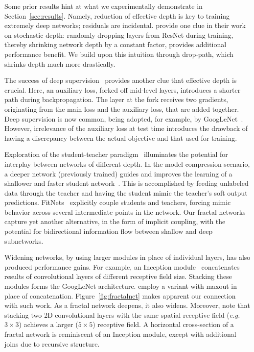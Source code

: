 \documentclass{article}
\def\eg{\emph{e.g.}}
\newcommand{\resnet}{ResNet}
\newcommand{\droppath}{drop-path}
\begin{document}
Some prior results hint at what we experimentally demonstrate in
Section~\ref{sec:results}.  Namely, reduction of effective depth is key to
training extremely deep networks; residuals are incidental.
\cite{huang2016stochasticdepth} provide one clue in their work on stochastic
depth: randomly dropping layers from {\resnet} during training, thereby
shrinking network depth by a constant factor, provides additional performance
benefit.  We build upon this intuition through {\droppath}, which shrinks depth
much more drastically.

The success of deep supervision~\citep{lee2014deeply} provides another clue
that effective depth is crucial.  Here, an auxiliary loss, forked off mid-level
layers, introduces a shorter path during backpropagation.  The layer at the
fork receives two gradients, originating from the main loss and the auxiliary
loss, that are added together.  Deep supervision is now common, being adopted,
for example, by GoogLeNet~\citep{szegedy2015inception}.  However, irrelevance
of the auxiliary loss at test time introduces the drawback of having a
discrepancy between the actual objective and that used for training.

Exploration of the student-teacher paradigm~\citep{ba2014dodeep} illuminates
the potential for interplay between networks of different depth.  In the model
compression scenario, a deeper network (previously trained) guides and improves
the learning of a shallower and faster student network~\citep{ba2014dodeep,
urban2016dodeepsfollowup}.  This is accomplished by feeding unlabeled data
through the teacher and having the student mimic the teacher's soft output
predictions.  FitNets~\citep{romero2014fitnets} explicitly couple students and
teachers, forcing mimic behavior across several intermediate points in the
network.  Our fractal networks capture yet another alternative, in the form of
implicit coupling, with the potential for bidirectional information flow
between shallow and deep subnetworks.

Widening networks, by using larger modules in place of individual layers, has
also produced performance gains.  For example, an Inception module~\citep{
szegedy2015inception} concatenates results of convolutional layers of different
receptive field size.  Stacking these modules forms the GoogLeNet architecture.
\cite{liao2015competitive} employ a variant with maxout in place of
concatenation.  Figure~\ref{fig:fractalnet} makes apparent our connection with
such work.  As a fractal network deepens, it also widens.  Moreover, note that
stacking two 2D convolutional layers with the same spatial receptive field
(\eg~$3 \times 3$) achieves a larger ($5 \times 5$) receptive field.  A
horizontal cross-section of a fractal network is reminiscent of an Inception
module, except with additional joins due to recursive structure.
 
\end{document}
